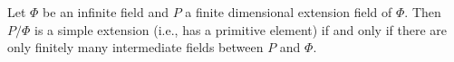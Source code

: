 Let $\Phi$ be an infinite field and $P$ a finite dimensional extension field of $\Phi$. Then $P/\Phi$ is a simple extension (i.e., has a primitive element) if and only if there are only finitely many intermediate fields between $P$ and $\Phi$.
